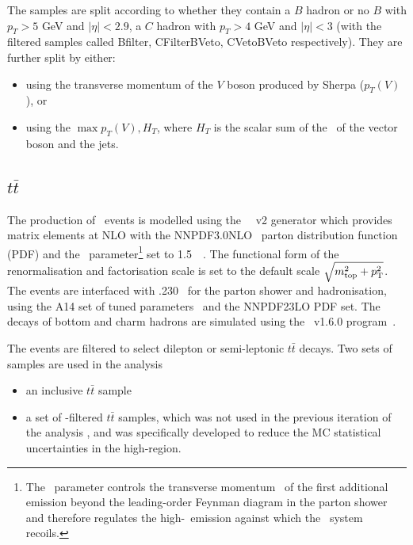 \par The samples are split according to whether they contain a $B$ hadron or no $B$ with $p_T > 5$ GeV and $|\eta|<2.9$, a $C$ hadron with $p_T > 4$ GeV and $|\eta|<3$ 
(with the filtered samples called Bfilter, CFilterBVeto, CVetoBVeto respectively). They are further split by either:

\begin{itemize}
	\item using the transverse momentum of the $V$ boson produced by Sherpa ($p_T(V)$), or
	\item using the $\max{p_T(V),H_T}$, where $H_T$ is the scalar sum of the \pt~of the vector boson and the jets.
\end{itemize}%

\subsection{$t\bar{t}$}

\par The production of \ttbar\ events is modelled using the \powhegbox~\cite{Frixione:2007nw,Nason:2004rx,Frixione:2007vw,Alioli:2010xd}~v2
generator which provides matrix elements at NLO with the NNPDF3.0NLO~\cite{Ball:2014uwa} parton distribution function (PDF) and the \hdamp\ parameter\footnote{The \hdamp\ parameter
controls the transverse momentum \pt\ of the first additional emission beyond the leading-order Feynman diagram
in the parton shower and therefore regulates the  high-\pt\ emission against which the \ttbar\ system recoils.} set to 1.5~\mtop~\cite{ATL-PHYS-PUB-2016-020}.
The functional form of the renormalisation and factorisation scale is set to the default scale $\sqrt{m_{\textrm{top}}^2 + p_{\textrm T}^2}$.
The events are interfaced with \pythia.230~\cite{Sjostrand:2014zea} for the parton shower and hadronisation,
using the A14 set of tuned parameters~\cite{ATL-PHYS-PUB-2014-021}  and the NNPDF23LO PDF set.
The decays of bottom and charm hadrons are simulated using the \evtgen\ v1.6.0 program~\cite{EvtGen}.

\par The events are filtered to select dilepton or semi-leptonic $t\bar{t}$ decays. Two sets of samples are used in the analysis

\begin{itemize}
	\item an inclusive $t\bar{t}$ sample
	\item a set of \met-filtered $t\bar{t}$ samples, which was not used in the previous iteration of the analysis \cite{ATLAS-CONF-2018-039}, and was specifically developed to reduce the MC statistical uncertainties in the high-\met region.
\end{itemize}

